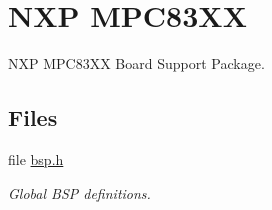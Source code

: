 \hypertarget{group__RTEMSBSPsPowerPCGen83XX}{}\section{N\+XP M\+P\+C83\+XX}
\label{group__RTEMSBSPsPowerPCGen83XX}


N\+XP M\+P\+C83\+XX Board Support Package.  


\subsection*{Files}
\begin{DoxyCompactItemize}
\item 
file \mbox{\hyperlink{bsps_2powerpc_2gen83xx_2include_2bsp_8h}{bsp.\+h}}
\begin{DoxyCompactList}\small\item\em Global B\+SP definitions. \end{DoxyCompactList}\end{DoxyCompactItemize}
